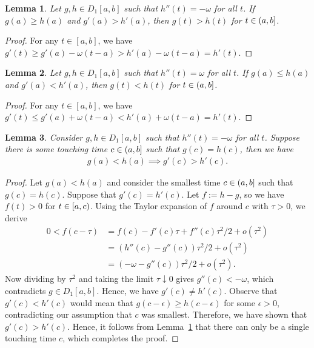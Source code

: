 \documentclass[a4paper]{article}
\theoremstyle{definition}
\theoremstyle{plain}
\newtheorem{lemma}{Lemma}
\begin{document}
\begin{lemma}
  \label{lemma:above}
  Let $g, h \in D_{1}[a, b]$ such that $h''(t) = -\omega$ for all $t$. If
  $g(a) \geq h(a)$ and $g'(a) > h'(a)$, then $g(t) > h(t)$ for
  $t \in (a,b]$.
\end{lemma}
\begin{proof}
  For any $t \in [a, b]$, we have
  $g'(t) \geq g'(a) - \omega (t-a) > h'(a) - \omega(t-a) = h'(t)$.
\end{proof}

\begin{lemma}
  \label{lemma:below}
  Let $g, h \in D_{1}[a, b]$ such that $h''(t) = \omega$ for all $t$. If
  $g(a) \leq h(a)$ and $g'(a) < h'(a)$, then $g(t) < h(t)$ for
  $t \in (a,b]$.
\end{lemma}
\begin{proof}
  For any $t \in [a, b]$, we have
  $g'(t) \leq g'(a) + \omega (t-a) < h'(a) + \omega(t-a) = h'(t)$.
\end{proof}

\begin{lemma}
  \label{lemma:cross-dec}
  Consider $g,h \in D_{1}[a, b]$ such that $h''(t) = -\omega$ for all $t$.
  Suppose there is some touching time $c \in (a,b]$ such that $g(c) = h(c)$, then
  we have
  \begin{align*}
    g(a) < h(a) \implies g'(c) > h'(c) .
  \end{align*}
\end{lemma}
\begin{proof}
  Let $g(a) < h(a)$ and consider the smallest time $c \in (a,b]$ such
  that $g(c) = h(c)$. Suppose that $g'(c) = h'(c)$. Let $f:= h - g$, so we have
  $f(t) > 0$ for $t \in [a,c)$. Using the Taylor expansion of $f$
  around $c$ with $\tau > 0$, we derive
  \begin{align*}
    0 < f(c - \tau) &= f(c) - f'(c)\tau + f''(c)\tau^{2} / 2 + o(\tau^{2}) \\
    &= (h''(c) - g''(c))\tau^{2} / 2 + o(\tau^{2}) \\
    &= (-\omega - g''(c))\tau^{2} / 2 + o(\tau^{2}) .
  \end{align*}
  Now dividing by $\tau^{2}$ and taking the limit $\tau \downarrow 0$ gives
  $g''(c) < -\omega$, which contradicts $g \in D_{1}[a,b]$. Hence, we have
  $g'(c) \neq h'(c)$. Observe that $g'(c) < h'(c)$ would mean that
  $g(c - \epsilon) \geq h(c - \epsilon)$ for some $\epsilon > 0$, contradicting our assumption that $c$
  was smallest. Therefore, we have shown that $g'(c) > h'(c)$. Hence, it follows
  from Lemma~\ref{lemma:above} that there can only be a single touching time $c$, which completes
  the proof.
\end{proof}
\end{document}
